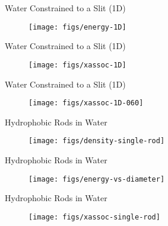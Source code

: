 \documentclass{beamer}
\begin{document}
\begin{frame}[fragile]{Water Constrained to a Slit (1D)}
\begin{figure}
\begin{center}
\texttt{[image: figs/energy-1D]}
\end{center}
\end{figure} 
\end{frame}

\begin{frame}[fragile]{Water Constrained to a Slit (1D)}
\begin{figure}
\begin{center}
\texttt{[image: figs/xassoc-1D]}
\end{center}
\end{figure} 
\end{frame}

\begin{frame}[fragile]{Water Constrained to a Slit (1D)}
\begin{figure}
\begin{center}
\texttt{[image: figs/xassoc-1D-060]}
\end{center}
\end{figure} 
\end{frame}

\begin{frame}[fragile]{Hydrophobic Rods in Water}
\begin{figure}
\begin{center}
\texttt{[image: figs/density-single-rod]}
\end{center}
\end{figure}
\end{frame}

\begin{frame}[fragile]{Hydrophobic Rods in Water}
\begin{figure}
\begin{center}
\texttt{[image: figs/energy-vs-diameter]}
\end{center}
\end{figure} 
\end{frame}

\begin{frame}[fragile]{Hydrophobic Rods in Water}
\begin{figure}
\begin{center}
\texttt{[image: figs/xassoc-single-rod]}
\end{center}
\end{figure} 
\end{frame}
\end{document}
